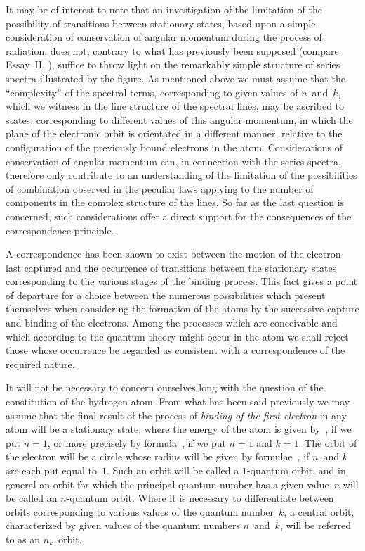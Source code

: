 It may be of interest to note that an investigation of the
limitation of the possibility of transitions between stationary
states, based upon a simple consideration of conservation of angular
momentum during the process of radiation, does not, contrary to
what has previously been supposed (compare Essay~II, ),
suffice to throw light on the remarkably simple structure of series
spectra illustrated by the figure. As mentioned above we must
assume that the ``complexity'' of the spectral terms, corresponding
to given values of $n$~and~$k$, which we witness in the fine
structure of the spectral lines, may be ascribed to states, corresponding
to different values of this angular momentum, in
which the plane of the electronic orbit is orientated in a different
manner, relative to the configuration of the previously bound
electrons in the atom. Considerations of conservation of angular
momentum can, in connection with the series spectra, therefore only
contribute to an understanding of the limitation of the possibilities
of combination observed in the peculiar laws applying to the
number of components in the complex structure of the lines. So
far as the last question is concerned, such considerations offer a
direct support for the consequences of the correspondence principle.



A correspondence has been shown to exist between the motion
of the electron last captured and the occurrence of transitions
between the stationary states corresponding to the various stages
of the binding process. This fact gives a point of departure for a
choice between the numerous possibilities which present themselves
when considering the formation of the atoms by the successive
capture and binding of the electrons. Among the processes which
are conceivable and which according to the quantum theory might
occur in the atom we shall reject those whose occurrence  be
regarded as consistent with a correspondence of the required nature.

 It will not be necessary to
concern ourselves long with the question of the constitution of the
hydrogen atom. From what has been said previously we may assume
that the final result of the process of \emph{binding of the first electron} in
any atom will be a stationary state, where the energy of the atom
is given by~, if we put $n = 1$, or more precisely by formula~,
if we put $n = 1$ and $k = 1$. The orbit of the electron will be a circle
whose radius will be given by formulae~, if $n$~and $k$ are each
put equal to~$1$. Such an orbit will be called a $1$-quantum orbit,
and in general an orbit for which the principal quantum number
has a given value~$n$ will be called an $n$-quantum orbit. Where it
is necessary to differentiate between orbits corresponding to various
values of the quantum number~$k$, a central orbit, characterized by
given values of the quantum numbers $n$~and~$k$, will be referred to
as an $n_{k}$~orbit.

